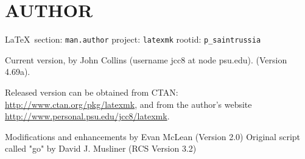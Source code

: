  
 
\section{AUTHOR}
  
\vspace{0.5cm}
 {\ifDEBUG\small\LaTeX~section: \verb|man.author| project: \verb|latexmk| rootid: \verb|p_saintrussia| \fi}
\vspace{0.5cm}
  


Current  version,  by  John  Collins  (username  jcc8 at node psu.edu).
(Version 4.69a).

Released     version     can      be      obtained      from      CTAN:
\url{http://www.ctan.org/pkg/latexmk},   and  from  the  author's  website
\url{http://www.personal.psu.edu/jcc8/latexmk}.

Modifications and enhancements by Evan McLean (Version 2.0)
Original script called "go" by David J. Musliner (RCS Version 3.2)

